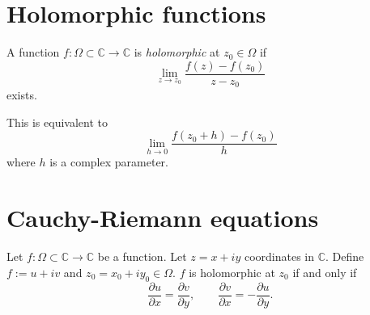 \section{Holomorphic functions}
\label{section-holomorphic-functions}

\begin{definition}
\label{definition-holomorphic-function}
A function $f:\Omega\subset \mathbb{C} \to \mathbb{C}$
is {\it holomorphic} at $z_0 \in \Omega$ if
$$
\lim_{z\to z_0} \frac{f(z)-f(z_0)}{z-z_0}
$$
exists.
\end{definition}

\noindent
This is equivalent to
\begin{equation}
\label{equation-holomorphic-function-second-definition}
\lim_{h\to 0} \frac{f(z_0+h)-f(z_0)}{h}
\end{equation}
where $h$ is a complex parameter.


\section{Cauchy-Riemann equations}
\label{sectioncauchy-riemann-equations}

\begin{theorem}
\label{theorem-cauchy-riemann}
Let $f:\Omega\subset\mathbb{C}\to \mathbb{C}$ be a function. Let $z=x+iy$ coordinates
in $\mathbb{C}$. Define $f:=u+iv$ and
$z_0=x_0+iy_0 \in \Omega$. $f$ is holomorphic at $z_0$ if and only if
$$
\frac{\partial u}{\partial x}=\frac{\partial v}{\partial y},\qquad
\frac{\partial v}{\partial x}=-\frac{\partial u}{\partial y}.
$$
\end{theorem}

